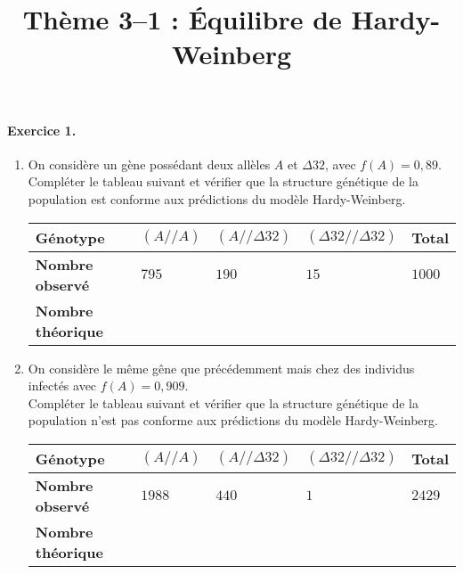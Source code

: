 \documentclass[11pt]{article}
\title{Thème 3--1 : Équilibre de Hardy-Weinberg}
\date{}
\author{}
\begin{document}
\paragraph{Exercice 1.}
\begin{enumerate}[leftmargin=*]
	\item
	On considère un gène possédant deux allèles $A$ et $\Delta 32$, avec $f(A) =0,89$.\\
	Compléter le tableau suivant et vérifier que la structure génétique de la population est conforme aux prédictions du modèle Hardy-Weinberg.
	\begin{center}
		\renewcommand{\arraystretch}{2}
		\begin{tabular}{|>{\centering\arraybackslash}m{3.5cm}|>{\centering\arraybackslash}m{2.5cm}|>{\centering\arraybackslash}m{2.5cm}|>{\centering\arraybackslash}m{2.5cm}|>{\centering\arraybackslash}m{2.5cm}|}
		\hline
		\textbf{Génotype} & $(A//A)$ & $(A//\Delta 32)$ & $(\Delta32//\Delta 32)$ & Total\\
		\hline
		\textbf{Nombre observé} & $795$ & $190$ & $15$ & ${1000}$\\
		\hline
		\textbf{Nombre théorique} & & & & \\
		\hline
	\end{tabular}
	\end{center}
	\item On considère le même gêne que précédemment mais chez des individus infectés avec $ f(A) =0,909$.\\
	Compléter le tableau suivant et vérifier que la structure génétique de la population n'est pas conforme aux prédictions du modèle Hardy-Weinberg.
	\begin{center}
		\renewcommand{\arraystretch}{2}
		\begin{tabular}{|>{\centering\arraybackslash}m{3.5cm}|>{\centering\arraybackslash}m{2.5cm}|>{\centering\arraybackslash}m{2.5cm}|>{\centering\arraybackslash}m{2.5cm}|>{\centering\arraybackslash}m{2.5cm}|}
		\hline
		\textbf{Génotype} & $(A//A)$ & $(A//\Delta 32)$ & $(\Delta32//\Delta 32)$ & Total\\
		\hline
		\textbf{Nombre observé} & ${1988}$ & $440$ & $1$ & ${2429}$\\
		\hline
		\textbf{Nombre théorique} & &  & & \\
		\hline
	\end{tabular}
	\end{center}
\end{enumerate}
\end{document}
